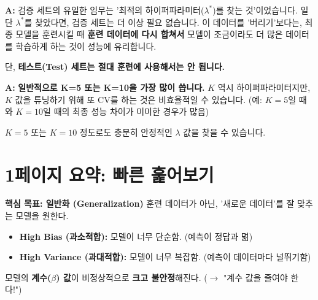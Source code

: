 \documentclass[11pt,a4paper]{book}
\theoremstyle{definition}
\begin{document}
\begin{tcolorbox}[title={Q: (단일 검증) Step 6에서 왜 검증(Validation) 세트를 다시 훈련(Train) 세트에 합쳐서 재훈련하나요?}]
\textbf{A:} 검증 세트의 유일한 임무는 '최적의 하이퍼파라미터($\lambda^*$)를 찾는 것'이었습니다.
일단 $\lambda^*$를 찾았다면, 검증 세트는 더 이상 필요 없습니다. 이 데이터를 '버리기'보다는, 최종 모델을 훈련시킬 때 \textbf{훈련 데이터에 다시 합쳐서} 모델이 조금이라도 더 많은 데이터를 학습하게 하는 것이 성능에 유리합니다.

단, \textbf{테스트(Test) 세트는 절대 훈련에 사용해서는 안 됩니다.}
\end{tcolorbox}

\begin{tcolorbox}[title={Q: K-Fold CV에서 K는 몇으로 정해야 하나요?}]
\textbf{A:} \textbf{일반적으로 K=5 또는 K=10을 가장 많이 씁니다.}
$K$ 역시 하이퍼파라미터지만, $K$ 값을 튜닝하기 위해 또 CV를 하는 것은 비효율적일 수 있습니다. (예: $K=5$일 때와 $K=10$일 때의 최종 성능 차이가 미미한 경우가 많음)

$K=5$ 또는 $K=10$ 정도로도 충분히 안정적인 $\lambda$ 값을 찾을 수 있습니다.
\end{tcolorbox}


\section{1페이지 요약: 빠른 훑어보기}

\begin{summarybox}
\textbf{핵심 목표: 일반화 (Generalization)}
훈련 데이터가 아닌, '새로운 데이터'를 잘 맞추는 모델을 원한다.
\end{summarybox}

\begin{tcolorbox}[title={1. 문제: 편향 vs. 분산 (Bias vs. Variance)}]
\begin{itemize}
    \item \textbf{High Bias (과소적합):} 모델이 너무 단순함. (예측이 정답과 멂)
    \item \textbf{High Variance (과대적합):} 모델이 너무 복잡함. (예측이 데이터마다 널뛰기함)
\end{itemize}
\end{tcolorbox}

\begin{tcolorbox}[title={2. 진단: 과대적합의 징후}]
모델의 \textbf{계수($\beta$) 값}이 비정상적으로 \textbf{크고 불안정}해진다.
($\rightarrow$ "계수 값을 줄여야 한다!")
\end{tcolorbox}
\end{document}
